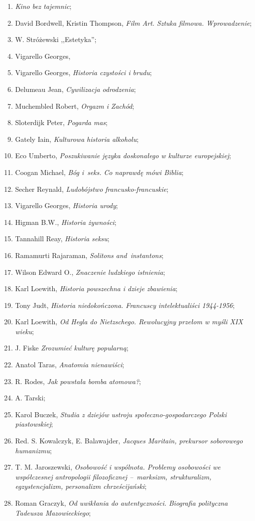 \documentclass[a4paper,11pt]{article}
\begin{document}
\begin{enumerate}
\item \emph{Kino bez tajemnic};
\item David Bordwell, Kristin Thompson, \emph{Film Art. Sztuka
    filmowa. Wprowadzenie};
\item W. Stróżewski ,,Estetyka'';
\item Vigarello Georges, \emph{}
\item Vigarello Georges, \emph{Historia czystości i brudu};
\item Delumeau Jean, \emph{Cywilizacja odrodzenia};
\item Muchembled Robert, \emph{Orgazm i Zachód};
\item Sloterdijk Peter, \emph{Pogarda mas};
\item Gately Iain, \emph{Kulturowa historia alkoholu};
\item Eco Umberto, \emph{Poszukiwanie języka doskonałego w kulturze
    europejskiej};
\item Coogan Michael, \emph{Bóg i~seks. Co naprawdę mówi Biblia};
\item Secher Reynald, \emph{Ludobójstwo francusko-francuskie};
\item Vigarello Georges, \emph{Historia urody};
\item Higman B.W., \emph{Historia żywności};
\item Tannahill Reay, \emph{Historia seksu};
\item Ramamurti Rajaraman, \emph{Solitons and~instantons};
\item Wilson Edward O., \emph{Znaczenie ludzkiego istnienia};
\item Karl Loewith, \emph{Historia powszechna i dzieje zbawienia};
\item Tony Judt, \emph{Historia niedokończona. Francuscy
    intelektualiści 1944-1956};
\item Karl Loewith, \emph{Od Hegla do Nietzschego. Rewolucyjny przełom
    w myśli XIX wieku};
\item J. Fiske \emph{Zrozumieć kulturę popularną};
\item Anatol Taras, \emph{Anatomia nienawiści};
\item R. Rodes, \emph{Jak powstała bomba atomowa?};
\item A. Tarski;
\item Karol Buczek, \emph{Studia z dziejów ustroju
    społeczno-gospodarczego Polski piastowskiej};
\item Red. S. Kowalczyk, E. Balawajder, \emph{Jacques Maritain,
    prekursor soborowego humanizmu};
\item T. M. Jaroszewski, \emph{Osobowość i wspólnota. Problemy
    osobowości we współczesnej antropologii filozoficznej --~marksizm,
    strukturalizm, egzystencjalizm, personalizm chrześcijański};
\item Roman Graczyk, \emph{Od uwikłania do autentyczności. Biografia
    polityczna Tadeusza Mazowieckiego};


\end{enumerate}
\end{document}
